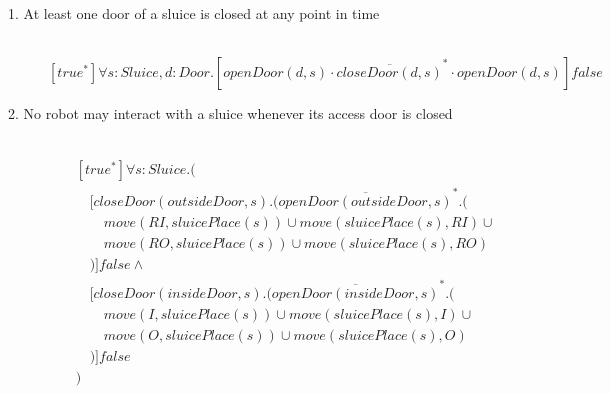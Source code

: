 
\newcommand{\tab}{\hspace{1em}}

\begin{description}
 \item[1. At least one door of a sluice is closed at any point in time]\mbox{}\\
\[
[true^*]\forall s:Sluice,d:Door.[openDoor(d, s) \cdot \overline{closeDoor(d, s)}^* \cdot openDoor(d, s)]\mathit{false}
\]


 \item[2. No robot may interact with a sluice whenever its access door is closed]\mbox{}\\
\begin{align*}
& [true^*]\forall s:Sluice.( \\
& \tab [closeDoor(outsideDoor, s).(\overline{openDoor(outsideDoor, s)}^*.( \\
& \tab\tab move(RI, sluicePlace(s)) \cup move(sluicePlace(s), RI) \cup \\
& \tab\tab move(RO, sluicePlace(s)) \cup move(sluicePlace(s), RO) \\
& \tab )]false \wedge \\
& \tab [closeDoor(insideDoor, s).(\overline{openDoor(insideDoor, s)}^*.( \\
& \tab\tab move(I, sluicePlace(s)) \cup move(sluicePlace(s), I) \cup \\
& \tab\tab move(O, sluicePlace(s)) \cup move(sluicePlace(s), O) \\
& \tab )]\mathit{false} \\
& )
\end{align*}
 
 \item[]
 

\end{description}
